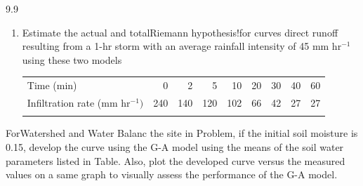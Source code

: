 \begin{problemlist}{9.9}
\begin{enumerate}[(2)]
\item[(2)] Estimate the actual and totalRiemann hypothesis!for
    curves direct
    runoff resulting from a 1-hr storm with an average
    rainfall intensity of 45 mm hr$^{-1}$ using these two
    models

\bigskip

\begin{unnumtable} [!h]
\processtable{}
{\hspace*{-28pt}\begin{tabular}{@{}lrrrrrrrr}
\dtoprule Time (min)& 0& 2& 5& 10& 20& 30& 40&60 \\[3pt]
Infiltration rate (mm hr$^{-1})$& 240& 140& 120& 102&
66&42& 27&27 \\
\dbottomrule
\end{tabular}}{}
\end{unnumtable}
\end{enumerate}


\item\label{ch01:prob3.16} ForWatershed and Water Balanc the
    site in Problem, if the
    initial soil moisture is 0.15, develop
    the curve using the G-A model
    using the means of the soil water parameters listed in
    Table. Also, plot the developed curve versus the measured
    values on a same graph to visually assess the performance
    of the G-A model.

\end{problemlist}



